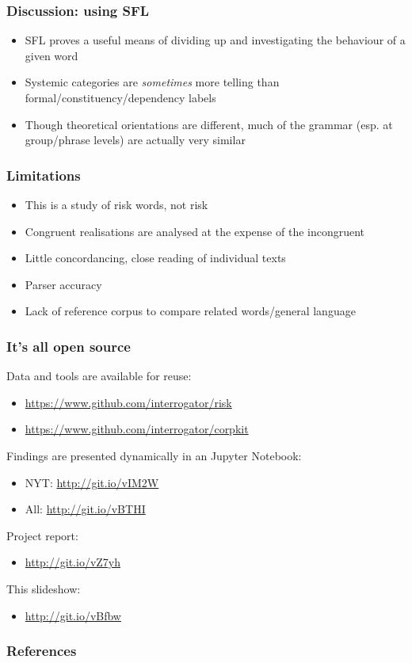 \documentclass{beamer}       %
\begin{document}
\begin{frame}
    \frametitle{Discussion: using SFL}
    \begin{itemize}
    \item SFL proves a useful means of dividing up and investigating the behaviour of a given word
    \item Systemic categories are \emph{sometimes} more telling than formal\slash constituency\slash dependency labels
    \item Though theoretical orientations are different, much of the grammar (esp. at group\slash phrase levels) are actually very similar
    \end{itemize}
\end{frame}

\begin{frame}\frametitle{Limitations}

\begin{itemize}
    \item This is a study of risk words, not risk
    \item Congruent realisations are analysed at the expense of the incongruent
    \item Little concordancing, close reading of individual texts
    \item Parser accuracy
    \item Lack of reference corpus to compare related words\slash general language
\end{itemize}
    
\end{frame}

\begin{frame}
    \frametitle{It's all open source}
    Data and tools are available for reuse:
    \begin{itemize}
    \item \url{https://www.github.com/interrogator/risk}
    \item \url{https://www.github.com/interrogator/corpkit}
    \end{itemize}
    Findings are presented dynamically in an Jupyter Notebook: 
    \begin{itemize}
    \item NYT: \url{http://git.io/vIM2W}
    \item All: \url{http://git.io/vBTHI}
    \end{itemize}
    Project report:
    \begin{itemize}
        \item \url{http://git.io/vZ7yh}
    \end{itemize}
    This slideshow:
    \begin{itemize}
    \item \url{http://git.io/vBfbw}
    \end{itemize}
\end{frame}

    \begin{frame}[t,allowframebreaks]
    \frametitle{References}
    
    
    \end{frame}
    
    
\end{document}
